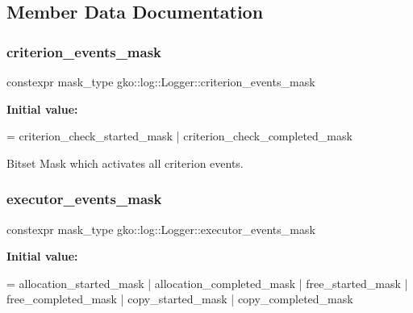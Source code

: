 \subsection{Member Data Documentation}
\mbox{\label{classgko_1_1log_1_1Logger_a7f4ac79625bd3f0287230236013f6048}} 
\subsubsection{\texorpdfstring{criterion\+\_\+events\+\_\+mask}{criterion\_events\_mask}}
{\footnotesize\ttfamily constexpr mask\+\_\+type gko\+::log\+::\+Logger\+::criterion\+\_\+events\+\_\+mask\hspace{0.3cm}{\ttfamily [static]}}

{\bfseries Initial value\+:}
\begin{DoxyCode}
=
        criterion\_check\_started\_mask | criterion\_check\_completed\_mask
\end{DoxyCode}


Bitset Mask which activates all criterion events. 

\mbox{\label{classgko_1_1log_1_1Logger_af263708ebb15007bc0086e7c438c190c}} 
\subsubsection{\texorpdfstring{executor\+\_\+events\+\_\+mask}{executor\_events\_mask}}
{\footnotesize\ttfamily constexpr mask\+\_\+type gko\+::log\+::\+Logger\+::executor\+\_\+events\+\_\+mask\hspace{0.3cm}{\ttfamily [static]}}

{\bfseries Initial value\+:}
\begin{DoxyCode}
=
        allocation\_started\_mask | allocation\_completed\_mask |
        free\_started\_mask | free\_completed\_mask | copy\_started\_mask |
        copy\_completed\_mask
\end{DoxyCode}


